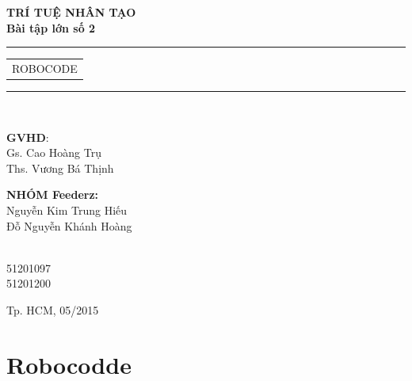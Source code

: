 \documentclass[14pt]{article}
\begin{document}
\vspace{1cm}

\begin{flushleft}
\Large \bfseries TRÍ TUỆ NHÂN TẠO\\
Bài tập lớn số 2\\[0.5cm]
\end{flushleft}
\rule{\textwidth}{1pt}
\vspace{2pt}
\begin{center}
\huge
\begin{tabular}{@{}l}
ROBOCODE\\[10pt]
\end{tabular}
\end{center}
\rule{\textwidth}{1pt}\\[1cm]

\vspace{1cm}

\begin{minipage}[t]{0.60\linewidth}
\textbf{GVHD}: \\
Gs. Cao Hoàng Trụ\\
Ths. Vương Bá Thịnh

\end{minipage}
\begin{minipage}[t]{0.25\linewidth}
\textbf{NHÓM Feederz:}\\
Nguyễn Kim Trung Hiếu\\
Đỗ Nguyễn Khánh Hoàng\\
\end{minipage}
\begin{minipage}[t]{0.20\linewidth}
\textbf{}\\
51201097\\
51201200\\
\end{minipage}
\begin{center}

\vspace{2cm}
{Tp. HCM, 05/2015}

\end{center}

\newpage
\thispagestyle{empty}
\tableofcontents
\thispagestyle{empty}

\newpage
\thispagestyle{empty}
\listoffigures

\newpage
\section{Robocodde}
\end{document}
